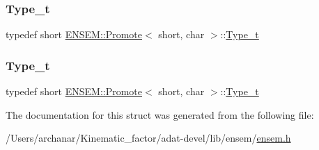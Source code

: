 \mbox{\label{structENSEM_1_1Promote_3_01short_00_01char_01_4_a17ccbda3b4c4ad881634810abd3eb2dc}} 
\subsubsection{\texorpdfstring{Type\_t}{Type\_t}\hspace{0.1cm}{\footnotesize\ttfamily [2/3]}}
{\footnotesize\ttfamily typedef short \mbox{\hyperlink{structENSEM_1_1Promote}{E\+N\+S\+E\+M\+::\+Promote}}$<$ short, char $>$\+::\mbox{\hyperlink{structENSEM_1_1Promote_3_01short_00_01char_01_4_a17ccbda3b4c4ad881634810abd3eb2dc}{Type\+\_\+t}}}

\mbox{\label{structENSEM_1_1Promote_3_01short_00_01char_01_4_a17ccbda3b4c4ad881634810abd3eb2dc}} 
\subsubsection{\texorpdfstring{Type\_t}{Type\_t}\hspace{0.1cm}{\footnotesize\ttfamily [3/3]}}
{\footnotesize\ttfamily typedef short \mbox{\hyperlink{structENSEM_1_1Promote}{E\+N\+S\+E\+M\+::\+Promote}}$<$ short, char $>$\+::\mbox{\hyperlink{structENSEM_1_1Promote_3_01short_00_01char_01_4_a17ccbda3b4c4ad881634810abd3eb2dc}{Type\+\_\+t}}}



The documentation for this struct was generated from the following file\+:\begin{DoxyCompactItemize}
\item 
/\+Users/archanar/\+Kinematic\+\_\+factor/adat-\/devel/lib/ensem/\mbox{\hyperlink{adat-devel_2lib_2ensem_2ensem_8h}{ensem.\+h}}\end{DoxyCompactItemize}

